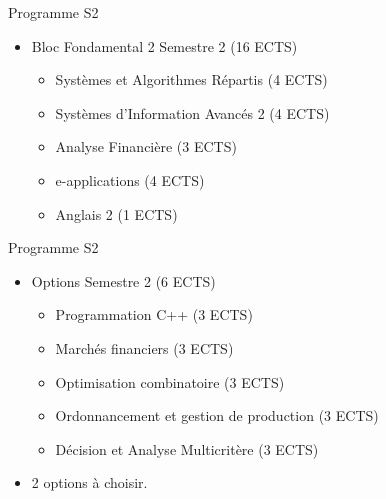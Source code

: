 \documentclass[minimal,compress]{beamer}
\begin{document}
\begin{frame}{Programme S2}
\begin{itemize}
\item \alert{Bloc Fondamental 2} Semestre 2 (16 ECTS)
\begin{itemize}
\item Systèmes et Algorithmes Répartis  (4 ECTS)
\item Systèmes d’Information Avancés 2 (4 ECTS)
\item Analyse Financière (3 ECTS) 
\item e-applications (4 ECTS)
\item Anglais 2 (1 ECTS)

\end{itemize}
\end{itemize}
\end{frame}

\begin{frame}{Programme S2}
\begin{itemize}
\item \alert{Options} Semestre 2 (6 ECTS) %
\begin{itemize}
\item Programmation C++ (3 ECTS)
\item {Marchés financiers (3 ECTS)} 
\item {Optimisation combinatoire (3 ECTS)} 
\item {Ordonnancement et  gestion de production (3 ECTS)}
\item {Décision et Analyse Multicritère (3 ECTS)} 
\end{itemize}
\item 2 options à choisir.
\end{itemize}
\end{frame}
\end{document}
